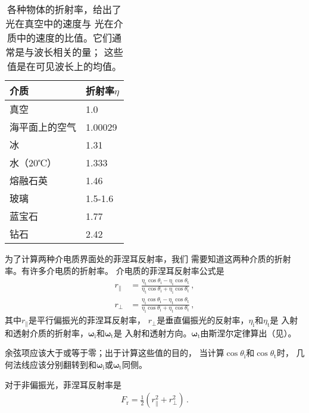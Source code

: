 \begin{table}[htbp]
    \centering
    \begin{tabular}{ll}
        \toprule
        \textbf{介质}  & \textbf{折射率}$\eta$ \\
        \midrule
        真空           & 1.0                   \\
        海平面上的空气 & 1.00029               \\
        冰             & 1.31                  \\
        水（20℃）      & 1.333                 \\
        熔融石英       & 1.46                  \\
        玻璃           & 1.5-1.6               \\
        蓝宝石         & 1.77                  \\
        钻石           & 2.42                  \\
        \bottomrule
    \end{tabular}
    \caption{各种物体的折射率，给出了光在真空中的速度与
        光在介质中的速度的比值。它们通常是与波长相关的量；
        这些值是在可见波长上的均值。}
    \label{tab:8.1}
\end{table}

为了计算两种介电质界面处的菲涅耳反射率，我们
需要知道这两种介质的折射率。有许多介电质的折射率。
介电质的菲涅耳反射率公式是
\begin{align*}
    r_{\parallel} & =\frac{\eta_{\mathrm{t}}\cos\theta_{\mathrm{i}}-\eta_{\mathrm{i}}\cos\theta_{\mathrm{t}}}{\eta_{\mathrm{t}}\cos\theta_{\mathrm{i}}+\eta_{\mathrm{i}}\cos\theta_{\mathrm{t}}}\, , \\
    r_{\perp}     & =\frac{\eta_{\mathrm{i}}\cos\theta_{\mathrm{i}}-\eta_{\mathrm{t}}\cos\theta_{\mathrm{t}}}{\eta_{\mathrm{i}}\cos\theta_{\mathrm{i}}+\eta_{\mathrm{t}}\cos\theta_{\mathrm{t}}}\, ,
\end{align*}
其中$r_{\parallel}$是平行偏振光的菲涅耳反射率，
$r_{\perp}$是垂直偏振光的反射率，$\eta_{\mathrm{i}}$和$\eta_{\mathrm{t}}$是
入射和透射介质的折射率，$\bm\omega_{\mathrm{i}}$和$\bm\omega_{\mathrm{t}}$是
入射和透射方向。$\bm\omega_{\mathrm{t}}$由斯涅尔定律算出（见）。

余弦项应该大于或等于零；出于计算这些值的目的，
当计算$\cos\theta_{\mathrm{i}}$和$\cos\theta_{\mathrm{t}}$时，
几何法线应该分别翻转到和$\bm\omega_{\mathrm{i}}$或$\bm\omega_{\mathrm{t}}$同侧。

对于非偏振光，菲涅耳反射率是
\begin{align*}
    F_{\mathrm{r}}=\frac{1}{2}(r_{\parallel}^2+r_{\perp}^2)\, .
\end{align*}

